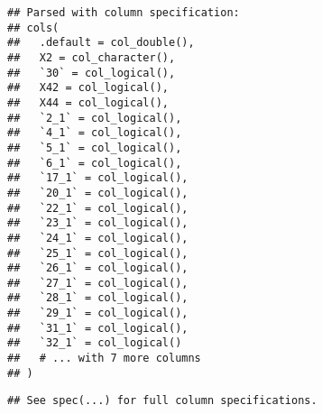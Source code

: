 \documentclass[]{article}
\begin{document}
\begin{verbatim}
## Parsed with column specification:
## cols(
##   .default = col_double(),
##   X2 = col_character(),
##   `30` = col_logical(),
##   X42 = col_logical(),
##   X44 = col_logical(),
##   `2_1` = col_logical(),
##   `4_1` = col_logical(),
##   `5_1` = col_logical(),
##   `6_1` = col_logical(),
##   `17_1` = col_logical(),
##   `20_1` = col_logical(),
##   `22_1` = col_logical(),
##   `23_1` = col_logical(),
##   `24_1` = col_logical(),
##   `25_1` = col_logical(),
##   `26_1` = col_logical(),
##   `27_1` = col_logical(),
##   `28_1` = col_logical(),
##   `29_1` = col_logical(),
##   `31_1` = col_logical(),
##   `32_1` = col_logical()
##   # ... with 7 more columns
## )
\end{verbatim}

\begin{verbatim}
## See spec(...) for full column specifications.
\end{verbatim}
\end{document}
